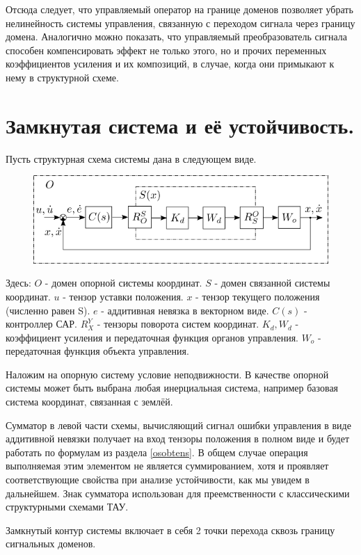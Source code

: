 \documentclass[a4paper]{article}
\begin{document}
Отсюда следует, что управляемый оператор на границе доменов позволяет убрать нелинейность системы управления, связанную с переходом сигнала через границу домена. Аналогично можно показать, что управляемый преобразователь сигнала способен компенсировать эффект не только этого, но и прочих переменных коэффициентов усиления и их композиций, в случае, когда они примыкают к нему в структурной схеме.

\section{Замкнутая система и её устойчивость.}
Пусть структурная схема системы дана в следующем виде.

{
\begin{figure}[H]
\centering
\includegraphics{./src/sheme.png}
\end{figure}
}

Здесь:
$O$ - домен опорной системы координат. 
$S$ - домен связанной системы координат.
$u$ - тензор уставки положения.
$x$ - тензор текущего положения (численно равен S).
$e$ - аддитивная невязка в векторном виде.
$C(s)$ - контроллер САР.
$R_X^Y$ - тензоры поворота систем координат.
$K_d, W_d$ - коэффициент усиления и передаточная функция органов управления.
$W_o$ - передаточная функция объекта управления.

Наложим на опорную систему условие неподвижности. В качестве опорной системы может быть выбрана любая инерциальная система, например базовая система координат, связанная с землёй.

Сумматор в левой части схемы, вычисляющий сигнал ошибки управления в виде аддитивной невязки получает на вход тензоры положения в полном виде и будет работать по формулам из раздела \ref{osobtens}. В общем случае операция выполняемая этим элементом не является суммированием, хотя и проявляет соответствующие свойства при анализе устойчивости, как мы увидем в дальнейшем. Знак сумматора использован для преемственности с классическими структурными схемами ТАУ.

Замкнутый контур системы включает в себя 2 точки перехода сквозь границу сигнальных доменов.
\end{document}
